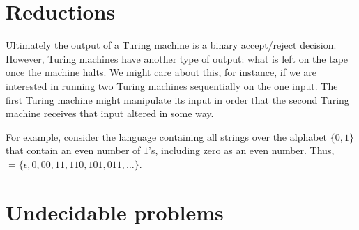 \section{Reductions}
  Ultimately the output of a Turing machine is a binary accept/reject decision.
  However, Turing machines have another type of output: what is left on the tape once the machine halts.
  We might care about this, for instance, if we are interested in running two Turing machines sequentially on the one input.
  The first Turing machine might manipulate its input in order that the second Turing machine receives that input altered in some way.

  For example, consider the language  containing all strings over the alphabet \( \{ 0,1 \} \) that contain an even number of \(1\)'s, including zero as an even number.
  Thus,  \(= \{\epsilon, 0, 00, 11, 110, 101, 011, \ldots\} \).



\section{}

\section{Undecidable problems}


